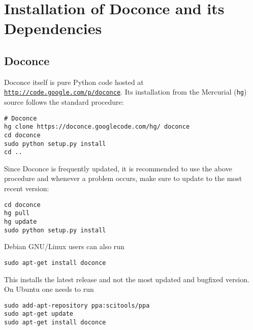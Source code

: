 \documentclass[%
oneside,                 %
final,                   %
10pt]{article}
\begin{document}
\section{Installation of Doconce and its Dependencies}

\subsection{Doconce}

Doconce itself is pure Python code hosted at \href{{http://code.google.com/p/doconce}}{\nolinkurl{http://code.google.com/p/doconce}}.  Its installation from the
Mercurial ({\fontsize{10pt}{10pt}\Verb!hg!}) source follows the standard procedure:
\vspace{4pt}
\begin{Verbatim}[numbers=none,frame=lines,label=\fbox{{\tiny Terminal}},fontsize=\fontsize{9pt}{9pt},
labelposition=topline,framesep=2.5mm,framerule=0.7pt]
# Doconce
hg clone https://doconce.googlecode.com/hg/ doconce
cd doconce
sudo python setup.py install
cd ..
\end{Verbatim}
Since Doconce is frequently updated, it is recommended to use the
above procedure and whenever a problem occurs, make sure to
update to the most recent version:
\vspace{4pt}
\begin{Verbatim}[numbers=none,frame=lines,label=\fbox{{\tiny Terminal}},fontsize=\fontsize{9pt}{9pt},
labelposition=topline,framesep=2.5mm,framerule=0.7pt]
cd doconce
hg pull
hg update
sudo python setup.py install
\end{Verbatim}

Debian GNU/Linux users can also run
\vspace{4pt}
\begin{Verbatim}[numbers=none,frame=lines,label=\fbox{{\tiny Terminal}},fontsize=\fontsize{9pt}{9pt},
labelposition=topline,framesep=2.5mm,framerule=0.7pt]
sudo apt-get install doconce
\end{Verbatim}
This installs the latest release and not the most updated and bugfixed
version.
On Ubuntu one needs to run
\vspace{4pt}
\begin{Verbatim}[numbers=none,frame=lines,label=\fbox{{\tiny Terminal}},fontsize=\fontsize{9pt}{9pt},
labelposition=topline,framesep=2.5mm,framerule=0.7pt]
sudo add-apt-repository ppa:scitools/ppa
sudo apt-get update
sudo apt-get install doconce
\end{Verbatim}
\end{document}
